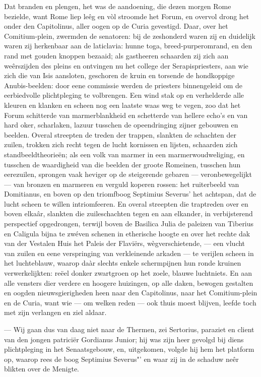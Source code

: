 \documentclass[a4paper, 12pt, oneside, dutch]{article}
\begin{document}
Dat branden en plengen, het was de aandoening, die dezen morgen Rome bezielde, want Rome liep leêg en vòl stroomde het Forum, en overvol drong het onder den Capitolinus, aller oogen op de Curia gevestigd. Daar, over het Comitium-plein, zwermden de senatoren: bij de zeshonderd waren zij en duidelijk waren zij herkenbaar aan de laticlavia: hunne toga, breed-purperomrand, en den rand met gouden knoppen bezaaid; als gastheeren schaarden zij zich aan weêrszijden des pleins en ontvingen nu het college der Serapispriesters, aan wie zich die van Isis aansloten, geschoren de kruin en torsende de hondkoppige Anubis-beelden: door eene commissie werden de priesters binnengeleid om de eerbiedvolle plichtpleging te volbrengen. Een wind stak op en verhelderde alle kleuren en klanken en scheen nog een laatste waas weg te vegen, zoo dat het Forum schitterde van marmerblankheid en schetterde van hellere echo's en van hard oker, scharlaken, lazuur tusschen de opeendringing zijner gebouwen en beelden. Overal streepten de treden der trappen, slankten de schachten der zuilen, trokken zich recht tegen de lucht kornissen en lijsten, schaarden zich standbeeldtheorieën; als een volk van marmer in een marmerwoudweliging, en tusschen de waardigheid van die beelden der groote Romeinen, tusschen hun eerezuilen, sprongen vaak heviger op de steigerende gebaren --- veronbewegelijkt --- van bronzen en marmeren en verguld koperen rossen: het ruiterbeeld van Domitianus, en boven op den triomfboog Septimius Severus' het achtspan, dat de lucht scheen te willen intriomfeeren. En overal streepten die traptreden over en boven elkaâr, slankten die zuileschachten tegen en aan elkander, in verbijsterend perspectief opgedrongen, terwijl boven de Basilica Julia de paleizen van Tiberius en Caligula bijna te zwéven schenen in etherische hoogte en over het rechte dak van der Vestalen Huis het Paleis der Flaviërs, wègverschietende, --- een vlucht van zuilen en eene verspringing van verkleinende arkaden --- te verijlen scheen in het luchteblauw, waarop daàr slechts enkele schermpijnen hun ronde kruinen verwerkelijkten: reëel donker zwartgroen op het zoele, blauwe luchtniets. En aan alle vensters dier verdere en hoogere huizingen, op alle daken, bewogen gestalten en oogden nieuwsgierigheden heen naar den Capitolinus, naar het Comitium-plein en de Curia, want wie --- om welken reden --- ook thuis moest blijven, leefde toch met zijn verlangen en ziel aldaar.

--- Wij gaan dus van daag niet naar de Thermen, zei Sertorius, paraziet en client van den jongen patriciër Gordianus Junior; hij was zijn heer gevolgd bij diens plichtpleging in het Senaatsgebouw, en, uitgekomen, volgde hij hem het platform op, waarop rees de boog Septimius Severus"' en waar zij in de schaduw neêr blikten over de Menigte.
\end{document}
